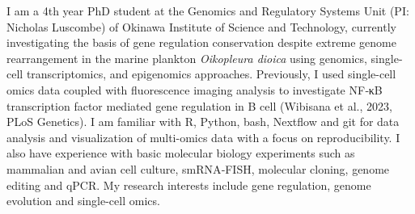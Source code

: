 

\begin{cvparagraph}

I am a 4th year PhD student at the Genomics and Regulatory Systems Unit (PI: Nicholas Luscombe) of Okinawa Institute of Science and Technology, currently investigating the basis of gene regulation conservation despite extreme genome rearrangement in the marine plankton \textit{Oikopleura dioica} using genomics, single-cell transcriptomics, and epigenomics approaches. Previously, I used single-cell omics data coupled with fluorescence imaging analysis to investigate NF‑κB transcription factor mediated gene regulation in B cell (Wibisana et al., 2023, PLoS Genetics). I am familiar with R, Python, bash, Nextflow and git for data analysis and visualization of multi-omics data with a focus on reproducibility. I also have experience with basic molecular biology experiments such as mammalian and avian cell culture, smRNA‑FISH, molecular cloning, genome editing and qPCR. My research interests include gene regulation, genome evolution and single-cell omics. 
\end{cvparagraph}
